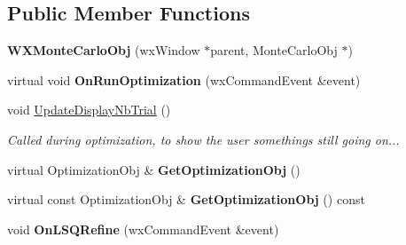 \subsection*{Public Member Functions}
\begin{DoxyCompactItemize}
\item 
\mbox{\label{class_obj_cryst_1_1_w_x_monte_carlo_obj_a7f065d157d74531110e16c7d8081a95c}} 
{\bfseries W\+X\+Monte\+Carlo\+Obj} (wx\+Window $\ast$parent, Monte\+Carlo\+Obj $\ast$)
\item 
\mbox{\label{class_obj_cryst_1_1_w_x_monte_carlo_obj_a30962c3e596117f11fdd3ca44c9594a2}} 
virtual void {\bfseries On\+Run\+Optimization} (wx\+Command\+Event \&event)
\item 
\mbox{\label{class_obj_cryst_1_1_w_x_monte_carlo_obj_acbceaa3d0ad0a5936d79a4322eca4df3}} 
void \mbox{\hyperlink{class_obj_cryst_1_1_w_x_monte_carlo_obj_acbceaa3d0ad0a5936d79a4322eca4df3}{Update\+Display\+Nb\+Trial}} ()
\begin{DoxyCompactList}\small\item\em Called during optimization, to show the user something\textquotesingle{}s still going on... \end{DoxyCompactList}\item 
\mbox{\label{class_obj_cryst_1_1_w_x_monte_carlo_obj_a03d4d281057644da82d973b7f73e4b2a}} 
virtual Optimization\+Obj \& {\bfseries Get\+Optimization\+Obj} ()
\item 
\mbox{\label{class_obj_cryst_1_1_w_x_monte_carlo_obj_a8e660d9b19e90e97ae37abfbbe8344aa}} 
virtual const Optimization\+Obj \& {\bfseries Get\+Optimization\+Obj} () const
\item 
\mbox{\label{class_obj_cryst_1_1_w_x_monte_carlo_obj_aa7c362490aa3761ae1426f2fe111d622}} 
void {\bfseries On\+L\+S\+Q\+Refine} (wx\+Command\+Event \&event)
\end{DoxyCompactItemize}

